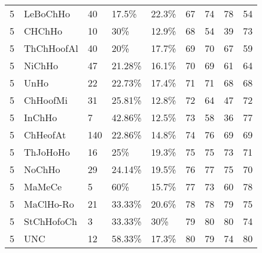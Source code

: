 \begin{longtable}{lllllrrrr}
  5 & LeBoChHo & 40 & 17.5\% & 22.3\% &  67 &  74 &  78 &  54 \\ 
  5 & CHChHo & 10 & 30\% & 12.9\% &  68 &  54 &  39 &  73 \\ 
  5 & ThChHoofAl & 40 & 20\% & 17.7\% &  69 &  70 &  67 &  59 \\ 
  5 & NiChHo & 47 & 21.28\% & 16.1\% &  70 &  69 &  61 &  64 \\ 
  5 & UnHo & 22 & 22.73\% & 17.4\% &  71 &  71 &  68 &  68 \\ 
  5 & ChHoofMi & 31 & 25.81\% & 12.8\% &  72 &  64 &  47 &  72 \\ 
  5 & InChHo & 7 & 42.86\% & 12.5\% &  73 &  58 &  36 &  77 \\ 
  5 & ChHeofAt & 140 & 22.86\% & 14.8\% &  74 &  76 &  69 &  69 \\ 
  5 & ThJoHoHo & 16 & 25\% & 19.3\% &  75 &  75 &  73 &  71 \\ 
  5 & NoChHo & 29 & 24.14\% & 19.5\% &  76 &  77 &  75 &  70 \\ 
  5 & MaMeCe & 5 & 60\% & 15.7\% &  77 &  73 &  60 &  78 \\ 
  5 & MaClHo-Ro & 21 & 33.33\% & 20.6\% &  78 &  78 &  79 &  75 \\ 
  5 & StChHofoCh & 3 & 33.33\% & 30\% &  79 &  80 &  80 &  74 \\ 
  5 & UNC & 12 & 58.33\% & 17.3\% &  80 &  79 &  74 &  80 \\ 
   \hline
\hline
\end{longtable}
